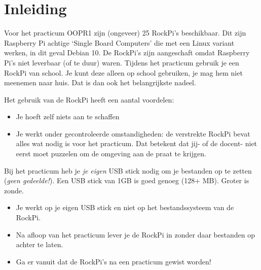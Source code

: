 \chapter{Inleiding}
Voor het practicum OOPR1 zijn (ongeveer) 25 RockPi’s beschikbaar. Dit zijn Raspberry Pi achtige ‘Single Board Computers’ die met een Linux variant werken, in dit geval Debian 10. De RockPi’s zijn aangeschaft omdat Raspberry Pi’s niet leverbaar (of te duur) waren.
Tijdens het practicum gebruik je een RockPi van school. Je kunt deze alleen op school gebruiken, je mag hem niet meenemen naar huis. Dat is dan ook het belangrijkste nadeel.

Het gebruik van de RockPi heeft een aantal voordelen:
\begin{itemize}
\item Je hoeft zelf niets aan te schaffen
\item Je werkt onder gecontroleerde omstandigheden: de verstrekte RockPi bevat alles wat nodig is voor het practicum. Dat betekent dat jij- of de docent- niet eerst moet puzzelen om de omgeving aan de praat te krijgen.
\end{itemize}

Bij het practicum heb je \textit{je eigen} USB stick nodig om je bestanden op te zetten (\textit{geen gedeelde!}). Een USB stick van 1GB is goed genoeg (128+ MB). Groter is zonde.
\begin{itemize}
\item Je werkt op je eigen USB stick en niet op het bestandssysteem van de RockPi. 
\item Na afloop van het practicum lever je de RockPi in zonder daar bestanden op achter te laten. 
\item Ga er vanuit dat de RockPi’s na een practicum gewist worden!
\end{itemize}

